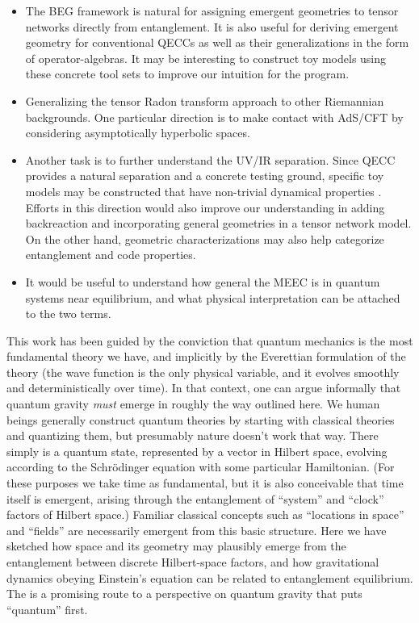 \documentclass[%
12pt,preprint,
nofootinbib,
amsmath,amssymb,
aps,
prd,
showpacs,
superscriptaddress
]{revtex4-2}
\begin{document}
\begin{itemize}
	\item The BEG framework is natural for assigning emergent geometries to tensor networks directly from entanglement. It is also useful for deriving emergent geometry for conventional QECCs as well as their generalizations in the form of operator-algebras. It may be interesting to construct toy models using these concrete tool sets to improve our intuition for the program.
	
	\item Generalizing the tensor Radon transform approach to other Riemannian backgrounds. One particular direction is to make contact with AdS/CFT by considering asymptotically hyperbolic spaces. 
	
	\item Another task is to further understand the UV/IR separation. Since QECC provides a natural separation and a concrete testing ground, specific toy models may be constructed that have non-trivial dynamical properties \cite{Osborne:2017woa}. Efforts in this direction would also improve our understanding in adding backreaction and incorporating general geometries in a tensor network model. On the other hand, geometric characterizations may also help categorize entanglement and code properties. 
	
	\item It would be useful to understand how general the MEEC is in quantum systems near equilibrium, and what physical interpretation can be attached to the two terms.
\end{itemize}


This work has been guided by the conviction that quantum mechanics is the most fundamental theory we have, and implicitly by the Everettian formulation of the theory (the wave function is the only physical variable, and it evolves smoothly and deterministically over time).
In that context, one can argue informally that quantum gravity \emph{must} emerge in roughly the way outlined here.
We human beings generally construct quantum theories by starting with classical theories and quantizing them, but presumably nature doesn't work that way.
There simply is a quantum state, represented by a vector in Hilbert space, evolving according to the Schr\"odinger equation with some particular Hamiltonian. (For these purposes we take time as fundamental, but it is also conceivable that time itself is emergent, arising through the entanglement of ``system'' and ``clock'' factors of Hilbert space.)
Familiar classical concepts such as ``locations in space'' and ``fields'' are necessarily emergent from this basic structure.
Here we have sketched how space and its geometry may plausibly emerge from the entanglement between discrete Hilbert-space factors, and how gravitational dynamics obeying Einstein's equation can be related to entanglement equilibrium.
The is a promising route to a perspective on quantum gravity that puts ``quantum'' first.
\end{document}

